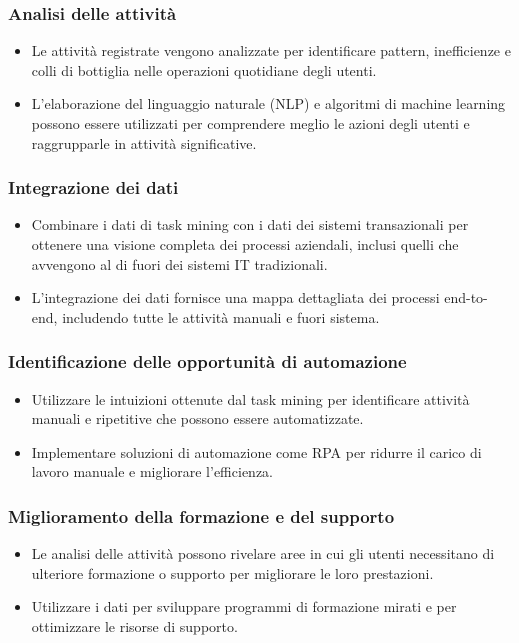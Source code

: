 \documentclass{article}
\begin{document}
\subsubsection{Analisi delle attività}
\begin{itemize}
    \item Le attività registrate vengono analizzate per identificare pattern, inefficienze e colli di bottiglia nelle operazioni quotidiane degli utenti.
    \item L'elaborazione del linguaggio naturale (NLP) e algoritmi di machine learning possono essere utilizzati per comprendere meglio le azioni degli utenti e raggrupparle in attività significative.
\end{itemize}
\subsubsection{Integrazione dei dati}
\begin{itemize}
    \item Combinare i dati di task mining con i dati dei sistemi transazionali per ottenere una visione completa dei processi aziendali, inclusi quelli che avvengono al di fuori dei sistemi IT tradizionali.
    \item L'integrazione dei dati fornisce una mappa dettagliata dei processi end-to-end, includendo tutte le attività manuali e fuori sistema.
\end{itemize}
\subsubsection{Identificazione delle opportunità di automazione}
\begin{itemize}
    \item Utilizzare le intuizioni ottenute dal task mining per identificare attività manuali e ripetitive che possono essere automatizzate.
    \item Implementare soluzioni di automazione come RPA per ridurre il carico di lavoro manuale e migliorare l'efficienza.
\end{itemize}
\subsubsection{Miglioramento della formazione e del supporto}
\begin{itemize}
    \item Le analisi delle attività possono rivelare aree in cui gli utenti necessitano di ulteriore formazione o supporto per migliorare le loro prestazioni.
    \item Utilizzare i dati per sviluppare programmi di formazione mirati e per ottimizzare le risorse di supporto.
\end{itemize}
\end{document}
